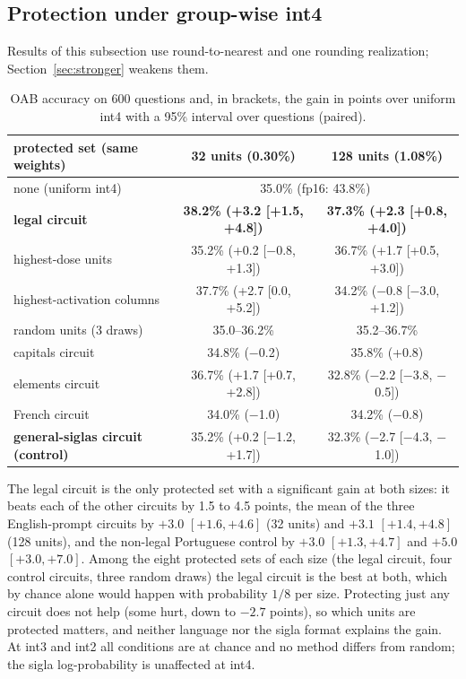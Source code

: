 \documentclass[11pt]{article}
\begin{document}
\subsection{Protection under group-wise int4}
Results of this subsection use round-to-nearest and one rounding realization; Section~\ref{sec:stronger} weakens them.
\begin{table}[h]
\centering\small
\begin{tabular}{lcc}
\toprule
protected set (same weights) & 32 units (0.30\%) & 128 units (1.08\%)\\
\midrule
none (uniform int4) & \multicolumn{2}{c}{35.0\% (fp16: 43.8\%)}\\
\textbf{legal circuit} & \textbf{38.2\% (+3.2 [+1.5, +4.8])} & \textbf{37.3\% (+2.3 [+0.8, +4.0])}\\
highest-dose units & 35.2\% (+0.2 [$-$0.8, +1.3]) & 36.7\% (+1.7 [+0.5, +3.0])\\
highest-activation columns & 37.7\% (+2.7 [0.0, +5.2]) & 34.2\% ($-$0.8 [$-$3.0, +1.2])\\
random units (3 draws) & 35.0--36.2\% & 35.2--36.7\%\\
capitals circuit & 34.8\% ($-$0.2) & 35.8\% (+0.8)\\
elements circuit & 36.7\% (+1.7 [+0.7, +2.8]) & 32.8\% ($-$2.2 [$-$3.8, $-$0.5])\\
French circuit & 34.0\% ($-$1.0) & 34.2\% ($-$0.8)\\
\textbf{general-siglas circuit (control)} & 35.2\% (+0.2 [$-$1.2, +1.7]) & 32.3\% ($-$2.7 [$-$4.3, $-$1.0])\\
\bottomrule
\end{tabular}
\caption{OAB accuracy on 600 questions and, in brackets, the gain in points over uniform int4 with a 95\% interval over questions (paired).}
\label{tab:protect4b}
\end{table}
The legal circuit is the only protected set with a significant gain at both sizes: it beats each of the other circuits by 1.5 to 4.5 points, the mean of the three English-prompt circuits by $+3.0$ $[+1.6,+4.6]$ (32 units) and $+3.1$ $[+1.4,+4.8]$
(128 units), and the non-legal Portuguese control by $+3.0$ $[+1.3,+4.7]$ and $+5.0$ $[+3.0,+7.0]$. Among the eight protected sets of each size (the legal circuit, four control circuits, three random draws) the legal circuit is the best at both,
which by chance alone would happen with probability $1/8$ per size. Protecting just any circuit does not help (some hurt, down to $-2.7$ points), so which units are protected matters, and neither language nor the sigla format explains the gain.
At int3 and int2 all conditions are at chance and no method differs from random; the sigla log-probability is unaffected at int4.
\end{document}
